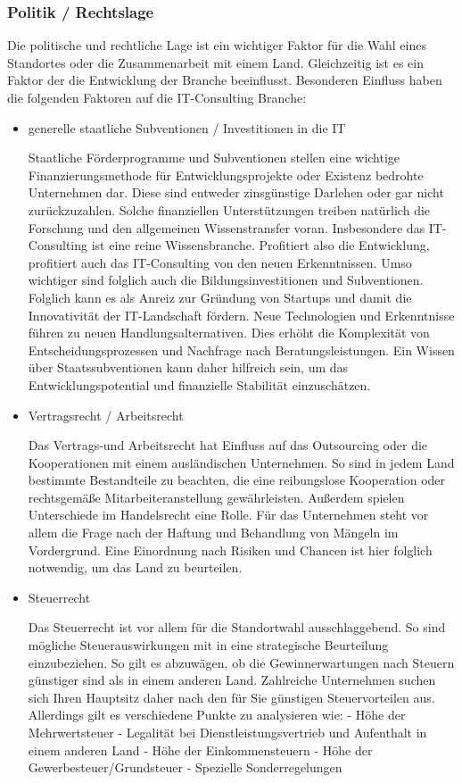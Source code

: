  \subsubsection{Politik / Rechtslage}
Die politische und rechtliche Lage ist ein wichtiger Faktor für die Wahl eines Standortes oder die Zusammenarbeit mit einem Land. Gleichzeitig ist es ein Faktor der die Entwicklung der Branche beeinflusst.
Besonderen Einfluss haben die folgenden Faktoren auf die IT-Consulting Branche:
\begin{itemize} 
\item {generelle staatliche Subventionen / Investitionen in die IT}

 Staatliche Förderprogramme und Subventionen stellen eine wichtige Finanzierungsmethode für Entwicklungsprojekte oder Existenz bedrohte Unternehmen dar. Diese sind entweder zinsgünstige Darlehen oder gar nicht zurückzuzahlen.
 Solche finanziellen Unterstützungen treiben natürlich die Forschung und den allgemeinen Wissenstransfer voran. Insbesondere das IT-Consulting ist eine reine Wissensbranche. Profitiert also die Entwicklung, profitiert auch das IT-Consulting von den neuen Erkenntnissen. 
 Umso wichtiger sind folglich auch die Bildungsinvestitionen und Subventionen. Folglich kann es als Anreiz zur Gründung von Startups und damit die Innovativität der IT-Landschaft fördern. Neue Technologien und Erkenntnisse führen zu neuen Handlungsalternativen. Dies erhöht die Komplexität von Entscheidungsprozessen und Nachfrage nach Beratungsleistungen.
Ein Wissen über Staatssubventionen kann daher hilfreich sein, um das Entwicklungspotential und finanzielle Stabilität einzuschätzen.

\item  {Vertragsrecht / Arbeitsrecht}

 Das Vertrags-und Arbeitsrecht hat Einfluss auf das Outsourcing oder die Kooperationen mit einem ausländischen Unternehmen. 
 So sind in jedem Land bestimmte Bestandteile zu beachten, die eine reibungslose Kooperation oder rechtsgemäße Mitarbeiteranstellung gewährleisten. Außerdem spielen Unterschiede im Handelsrecht eine Rolle. 
Für das Unternehmen steht vor allem die Frage nach der Haftung und Behandlung von Mängeln im Vordergrund. 
Eine Einordnung nach Risiken und Chancen ist hier folglich notwendig, um das Land zu beurteilen. 

\item {Steuerrecht}

 Das Steuerrecht ist vor allem für die Standortwahl ausschlaggebend. 
 So sind mögliche Steuerauswirkungen mit in eine strategische Beurteilung  einzubeziehen. So gilt es abzuwägen, ob die Gewinnerwartungen nach Steuern günstiger sind als in einem anderen Land. Zahlreiche Unternehmen suchen sich Ihren Hauptsitz daher nach den für Sie günstigen Steuervorteilen aus.
 Allerdings gilt es verschiedene Punkte zu analysieren wie:
 - Höhe der Mehrwertsteuer
 - Legalität bei Dienstleistungsvertrieb und Aufenthalt in einem anderen Land
 - Höhe der Einkommensteuern
 - Höhe der Gewerbesteuer/Grundsteuer
 - Spezielle Sonderregelungen
 

\end{itemize}
